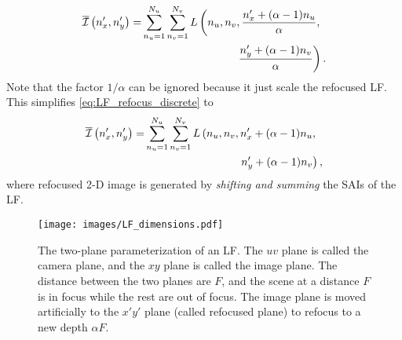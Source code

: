 \begin{align}
\label{eq:LF_refocus_discrete}
\overline{\mathcal{I}}\left( n_x' ,n_y'\right) =&\sum_{n_u=1}^{N_u}\sum_{n_v=1}^{N_v} L\left( n_u,n_v,\frac{n_x'+(\alpha-1) n_u}{\alpha}, \right. \notag \\ 
& \left. \hspace{3cm} \frac{n_y'+(\alpha-1)n_v}{\alpha}\right).
\end{align}
Note that the factor $1/\alpha$ can be ignored because it just scale the refocused LF. This simplifies \eqref{eq:LF_refocus_discrete} to   
\begin{align}
\label{eq:LF_refocus_simple}
\overline{\mathcal{I}}\left( n_x' ,n_y'\right) =&\sum_{n_u=1}^{N_u}\sum_{n_v=1}^{N_v} L\left( n_u,n_v,n_x'+(\alpha-1) n_u, \right. \notag \\ 
& \left. \hspace{3cm} n_y'+(\alpha-1)n_v\right),
\end{align}
where refocused 2-D image is generated by \emph{shifting and summing} the SAIs of the LF. 
 






\begin{figure}[!t]
    \centering
    \texttt{[image: images/LF\_dimensions.pdf]}
    \caption{The two-plane parameterization of an LF. The $uv$ plane is called the camera plane, and the $xy$ plane is called the image plane. The distance between the two planes are $F$, and the scene at a distance $F$ is in focus while the rest are out of focus. The image plane is moved artificially to the $x'y'$ plane (called refocused plane) to refocus to a new depth $\alpha F$.}
    \label{fig:refocus}
\end{figure}

